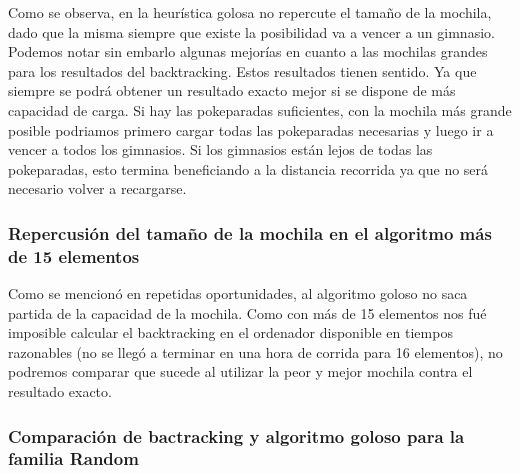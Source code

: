 Como se observa, en la heurística golosa no repercute el tamaño de la mochila, dado que la misma siempre que existe la posibilidad va a vencer a un gimnasio. Podemos notar sin embarlo algunas mejorías en cuanto a las mochilas grandes para los resultados del backtracking. Estos resultados tienen sentido. Ya que siempre se podrá obtener un resultado exacto mejor si se dispone de más capacidad de carga. Si hay las pokeparadas suficientes, con la mochila más grande posible podriamos primero cargar todas las pokeparadas necesarias y luego ir a vencer a todos los gimnasios. Si los gimnasios están lejos de todas las pokeparadas, esto termina beneficiando a la distancia recorrida ya que no será necesario volver a recargarse. 

\newpage

\subsubsection*{Repercusi\'on del tamaño de la mochila en el algoritmo más de 15 elementos}

Como se mencionó en repetidas oportunidades, al algoritmo goloso no saca partida de la capacidad de la mochila. Como con más de 15 elementos nos fué imposible calcular el backtracking en el ordenador disponible en tiempos razonables (no se llegó a terminar en una hora de corrida para 16 elementos), no podremos comparar que sucede al utilizar la peor y mejor mochila contra el resultado exacto.

\subsubsection*{Comparación de bactracking y algoritmo goloso para la familia Random}

\begin{figure} [h]
 \centering
       \label{fig:randomexacto}
    \label{fig:randomgoloso}
    \end{figure}
 
